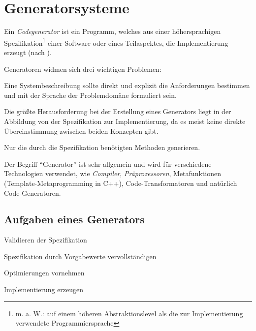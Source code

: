 \section{Generatorsysteme}
\label{sec:generatorsystems}

Ein \emph{Codegenerator} ist ein Programm, welches aus einer höhersprachigen Spezifikation\footnote{m. a. W.: auf einem höheren Abstraktionslevel als die zur Implementierung verwendete Programmiersprache} einer Software oder eines Teilaspektes, die Implementierung erzeugt (nach \cite{czarnecki2000generative}).

Generatoren widmen sich drei wichtigen Problemen\cite{czarnecki2000generative}:
\begin{description}[style=nextline]
    \item[Relevanz von Systembeschreibungen erhöhen] Eine Systembeschreibung sollte direkt und explizit die Anforderungen bestimmen und mit der Sprache der Problemdomäne formuliert sein.
    \item[Erzeugung einer effizienten Implementierung] Die größte Herausforderung bei der Erstellung eines Generators liegt in der Abbildung von der Spezifikation zur Implementierung, da es meist keine direkte Übereinstimmung zwischen beiden Konzepten gibt.
    \item[\enquote{Library scaling problem}] Nur die durch die Spezifikation benötigten Methoden generieren.
\end{description}

Der Begriff \enquote{Generator} ist sehr allgemein und wird für verschiedene Technologien verwendet, wie \emph{Compiler}, \emph{Präprozessoren}, Metafunktionen (Template-Metaprogramming in C++), Code-Transformatoren und natürlich Code-Generatoren.

\subsection{Aufgaben eines Generators}
\begin{compactenum}
    \item Validieren der Spezifikation
    \item Spezifikation durch Vorgabewerte vervollständigen
    \item Optimierungen vornehmen
    \item Implementierung erzeugen
\end{compactenum}

